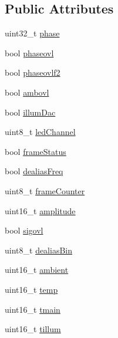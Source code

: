 \subsection*{Public Attributes}
\begin{DoxyCompactItemize}
\item 
uint32\+\_\+t \mbox{\hyperlink{class_o_p_t3101_1_1frame_data_c_acac63e6ee5d619fde4e8d1dfbf75b3f0}{phase}}
\item 
bool \mbox{\hyperlink{class_o_p_t3101_1_1frame_data_c_a215ee0c78a8a3ccf401c504190cde782}{phaseovl}}
\item 
bool \mbox{\hyperlink{class_o_p_t3101_1_1frame_data_c_a3d351e94751d82291849af774be91b5b}{phaseovlf2}}
\item 
bool \mbox{\hyperlink{class_o_p_t3101_1_1frame_data_c_a4dd83c3e12c8e9912edea1e31bab4c36}{ambovl}}
\item 
bool \mbox{\hyperlink{class_o_p_t3101_1_1frame_data_c_a211a1d7ec065617890f5c5c627dd6b91}{illum\+Dac}}
\item 
uint8\+\_\+t \mbox{\hyperlink{class_o_p_t3101_1_1frame_data_c_a05bb6db589233fa38314befeff48f646}{led\+Channel}}
\item 
bool \mbox{\hyperlink{class_o_p_t3101_1_1frame_data_c_a335f6aacd18a4cbb711ca77b73f988c0}{frame\+Status}}
\item 
bool \mbox{\hyperlink{class_o_p_t3101_1_1frame_data_c_a9f9849a9afea1e70e72526f216ab327b}{dealias\+Freq}}
\item 
uint8\+\_\+t \mbox{\hyperlink{class_o_p_t3101_1_1frame_data_c_a76f63540aaf884343252fe6861065404}{frame\+Counter}}
\item 
uint16\+\_\+t \mbox{\hyperlink{class_o_p_t3101_1_1frame_data_c_a37afc0107765d8e4aee6cc53471b14db}{amplitude}}
\item 
bool \mbox{\hyperlink{class_o_p_t3101_1_1frame_data_c_af93d6d38c34644bdfa4225a5b4a68b1a}{sigovl}}
\item 
uint8\+\_\+t \mbox{\hyperlink{class_o_p_t3101_1_1frame_data_c_a2f212a7fc1f54d3feb829d734dd4fce4}{dealias\+Bin}}
\item 
uint16\+\_\+t \mbox{\hyperlink{class_o_p_t3101_1_1frame_data_c_abb33d925d3792c2420b0b8bf055b73c4}{ambient}}
\item 
uint16\+\_\+t \mbox{\hyperlink{class_o_p_t3101_1_1frame_data_c_a9edb9b641158fc09caada374ee941d45}{temp}}
\item 
uint16\+\_\+t \mbox{\hyperlink{class_o_p_t3101_1_1frame_data_c_a5c1cd938fc62d4672d15842df1f7f539}{tmain}}
\item 
uint16\+\_\+t \mbox{\hyperlink{class_o_p_t3101_1_1frame_data_c_ab8de475cc7a584e2c3df93935ffb5601}{tillum}}
\end{DoxyCompactItemize}


